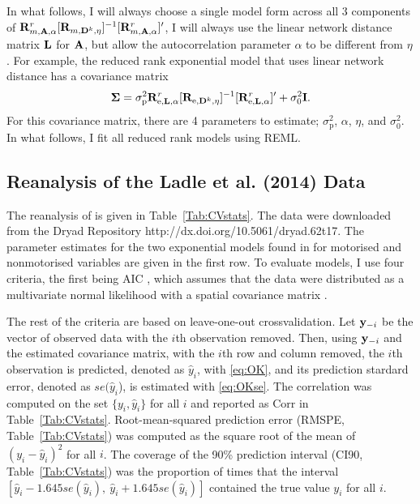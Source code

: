 \documentclass[11pt, titlepage]{article}\usepackage[]{graphicx}\usepackage[]{color}
\begin{document}
\begin{spacing}{1.9}
\begin{flushleft}
In what follows, I will always choose a single model form across all 3 components of $\mathbf{R}^r_{m,\mathbf{A},\alpha}[\mathbf{R}_{m,\mathbf{D}^k,\eta}]^{-1}[\mathbf{R}^r_{m,\mathbf{A},\alpha}]^{\prime}$, I will always use the linear network distance matrix $\mathbf{L}$ for $\mathbf{A}$, but allow the autocorrelation parameter $\alpha$ to be different from $\eta$.  For example, the reduced rank exponential model that uses linear network distance has a covariance matrix
\begin{equation} \label{eq:RRmodCov}
				\mbox{\boldmath $\Sigma$} = \sigma^2_\textrm{p}\mathbf{R}^r_{\textrm{e},\mathbf{L},\alpha}[\mathbf{R}_{\textrm{e},\mathbf{D}^k,\eta}]^{-1}[\mathbf{R}^r_{\textrm{e},\mathbf{L},\alpha}]^{\prime} + \sigma^2_0\mathbf{I}.
\end{equation}
For this covariance matrix, there are 4 parameters to estimate; $\sigma^2_\textrm{p}$, $\alpha$, $\eta$, and $\sigma^2_0$.  In what follows, I fit all reduced rank models using REML.

\subsection*{Reanalysis of the Ladle et al. (2014) Data}

The reanalysis of \citet{Ladl:Avga:Whea:Boyc:pred:2016} is given in Table~\ref{Tab:CVstats}. The data were downloaded from the Dryad Repository http://dx.doi.org/10.5061/dryad.62t17.  The parameter estimates for the two exponential models found in \citet{Ladl:Avga:Whea:Boyc:pred:2016} for motorised and nonmotorised variables are given in the first row.  To evaluate models, I use four criteria, the first being AIC \citep{Akai:Info:1973,Burn:Ande:mode:2002}, which assumes that the data were distributed as a multivariate normal likelihood with a spatial covariance matrix \citep[for an example using spatial models, see][]{Hoet:Davi:Mert:Thom:mode:2006}.   

The rest of the criteria are based on leave-one-out crossvalidation.  Let $\mathbf{y}_{-i}$ be the vector of observed data with the $i$th observation removed. Then, using $\mathbf{y}_{-i}$ and the estimated covariance matrix, with the $i$th row and column removed, the $i$th observation is predicted, denoted as $\hat{y}_i$,  with \ref{eq:OK}, and its prediction stardard error, denoted as $se(\hat{y}_i$), is estimated with \ref{eq:OKse}. The correlation was computed on the set $\{y_i,\hat{y}_i\}$ for all $i$ and reported as Corr in Table~\ref{Tab:CVstats}.  Root-mean-squared prediction error (RMSPE, Table~\ref{Tab:CVstats}) was computed as the square root of the mean of $(y_i-\hat{y}_i)^2$ for all $i$. The coverage of the 90\% prediction interval (CI90, Table~\ref{Tab:CVstats}) was the proportion of times that the interval $[\hat{y}_i - 1.645 se(\hat{y}_i), \ \hat{y}_i + 1.645 se(\hat{y}_i)]$ contained the true value $y_i$ for all $i$.


\end{flushleft}
\end{spacing}
\end{document}
